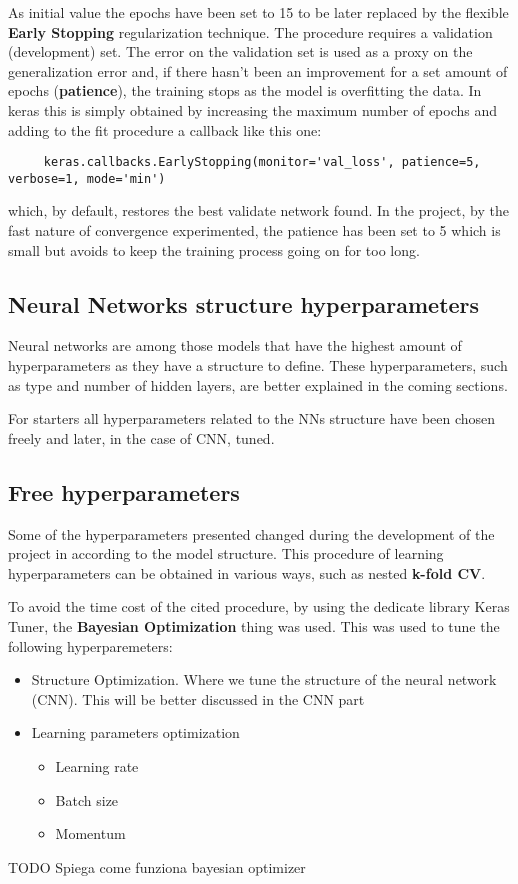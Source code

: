 As initial value the epochs have been set to 15 to be later replaced by the flexible \textbf{Early Stopping} regularization technique.
The procedure requires a validation (development) set.
The error on the validation set is used as a proxy on the generalization error and, if there hasn't been an improvement
for a set amount of epochs (\textbf{patience}), the training stops as the model is overfitting the data.
In keras this is simply obtained by increasing the maximum number of epochs and adding to the fit procedure a callback like this one:
\begin{verbatim}
     keras.callbacks.EarlyStopping(monitor='val_loss', patience=5, verbose=1, mode='min')
\end{verbatim}

which, by default, restores the best validate network found.
In the project, by the fast nature of convergence experimented, the patience has been set to 5 which is small
but avoids to keep the training process going on for too long.

\subsection{Neural Networks structure hyperparameters}
\label{subsec:neural-networks-structure-hyperparameters}
Neural networks are among those models that have the highest amount of hyperparameters as they have a structure to define.
These hyperparameters, such as type and number of hidden layers, are better explained in the coming sections.


For starters all hyperparameters related to the NNs structure have been chosen freely and later, in the case of CNN, tuned.

\subsection{Free hyperparameters}
\label{subsec:free-hyperparameters}
Some of the hyperparameters presented changed during the development of the project in according to the model structure.
This procedure of learning hyperparameters can be obtained in various ways, such as nested \textbf{k-fold CV}.


To avoid the time cost of the cited procedure, by using the dedicate library Keras Tuner,  the
\textbf{Bayesian Optimization} thing was used. This was used to tune the following hyperparemeters:

\begin{itemize}
    \item Structure Optimization. Where we tune the structure of the neural network (CNN).
    This will be better discussed in the CNN part %
    \item Learning parameters optimization
    \begin{itemize}
        \item Learning rate
        \item Batch size
        \item Momentum
    \end{itemize}
\end{itemize}
TODO Spiega come funziona bayesian optimizer
